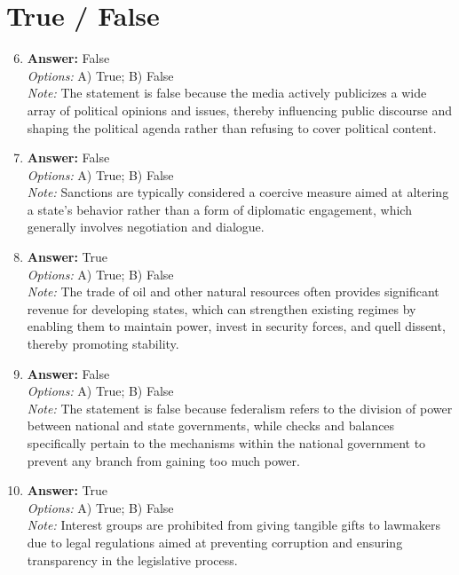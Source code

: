 \documentclass[12pt]{article}
\begin{document}
\section*{True / False}
\begin{enumerate}[label=\arabic*.]
\setcounter{enumi}{5}
\item \textbf{Answer:} False
\\ \textit{Options:} A) True; B) False
\\ \textit{Note:} The statement is false because the media actively publicizes a wide array of political opinions and issues, thereby influencing public discourse and shaping the political agenda rather than refusing to cover political content.
\item \textbf{Answer:} False
\\ \textit{Options:} A) True; B) False
\\ \textit{Note:} Sanctions are typically considered a coercive measure aimed at altering a state's behavior rather than a form of diplomatic engagement, which generally involves negotiation and dialogue.
\item \textbf{Answer:} True
\\ \textit{Options:} A) True; B) False
\\ \textit{Note:} The trade of oil and other natural resources often provides significant revenue for developing states, which can strengthen existing regimes by enabling them to maintain power, invest in security forces, and quell dissent, thereby promoting stability.
\item \textbf{Answer:} False
\\ \textit{Options:} A) True; B) False
\\ \textit{Note:} The statement is false because federalism refers to the division of power between national and state governments, while checks and balances specifically pertain to the mechanisms within the national government to prevent any branch from gaining too much power.
\item \textbf{Answer:} True
\\ \textit{Options:} A) True; B) False
\\ \textit{Note:} Interest groups are prohibited from giving tangible gifts to lawmakers due to legal regulations aimed at preventing corruption and ensuring transparency in the legislative process.
\end{enumerate}
\end{document}
